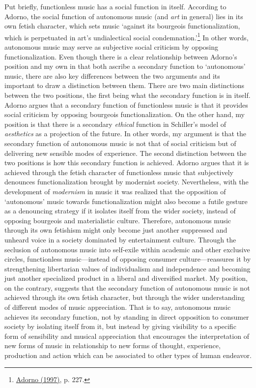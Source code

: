 Put briefly, functionless music has a social function in itself. According to Adorno, the social function of autonomous music (and \emph{art} in general) lies in its own fetish character, which sets music `against its bourgeois functionalization, which is perpetuated in art's undialectical social condemnation.'\footnote{\hyperlink{adornoaesth}{Adorno (1997)}, p. 227.} In other words, autonomous music may serve as subjective social criticism by opposing functionalization. Even though there is a clear relationship between Adorno's position and my own in that both ascribe a secondary function to `autonomous' music, there are also key differences between the two arguments and its important to draw a distinction between them. There are two main distinctions between the two positions, the first being what the secondary function is in itself. Adorno argues that a secondary function of functionless music is that it provides social criticism by opposing bourgeois functionalization. On the other hand, my position is that there is a secondary \emph{ethical} function in Schiller's model of \emph{aesthetics} as a projection of the future. In other words, my argument is that the secondary function of autonomous music is not that of social criticism but of delivering new sensible modes of experience. The second distinction between the two positions is how this secondary function is achieved. Adorno argues that it is achieved through the fetish character of functionless music that subjectively denounces functionalization brought by modernist society. Nevertheless, with the development of \emph{modernism} in music it was realized that the opposition of `autonomous' music towards functionalization might also become a futile gesture as a denouncing strategy if it isolates itself from the wider society, instead of opposing bourgeois and materialistic culture. Therefore, autonomous music through its own fetishism might only become just another suppressed and unheard voice in a society dominated by entertainment culture. Through the seclusion of autonomous music into self-exile within academic and other exclusive circles, functionless music---instead of opposing consumer culture---reassures it by strengthening libertarian values of individualism and independence and becoming just another specialized product in a liberal and diversified market. My position, on the contrary, suggests that the secondary function of autonomous music is not achieved through its own fetish character, but through the wider understanding of different modes of music appreciation. That is to say, autonomous music achieves its secondary function, not by standing in direct opposition to consumer society by isolating itself from it, but instead by giving visibility to a specific form of sensibility and musical appreciation that encourages the interpretation of new forms of music in relationship to new forms of thought, experience, production and action which can be associated to other types of human endeavor.

